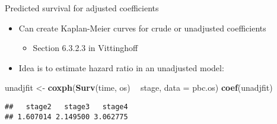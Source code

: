 \documentclass[
  ignorenonframetext,
]{beamer}
\newenvironment{Shaded}{\begin{snugshade}}{\end{snugshade}}
\newcommand{\DataTypeTok}[1]{\textcolor[rgb]{0.13,0.29,0.53}{#1}}
\newcommand{\KeywordTok}[1]{\textcolor[rgb]{0.13,0.29,0.53}{\textbf{#1}}}
\newcommand{\NormalTok}[1]{#1}
\newcommand{\OperatorTok}[1]{\textcolor[rgb]{0.81,0.36,0.00}{\textbf{#1}}}
\newcommand{\StringTok}[1]{\textcolor[rgb]{0.31,0.60,0.02}{#1}}
\providecommand{\tightlist}{%
  \setlength{\itemsep}{0pt}\setlength{\parskip}{0pt}}
\begin{document}
\begin{frame}[fragile]{Predicted survival for adjusted coefficients}
\protect\hypertarget{predicted-survival-for-adjusted-coefficients}{}

\begin{itemize}
\tightlist
\item
  Can create Kaplan-Meier curves for crude or unadjusted coefficients

  \begin{itemize}
  \tightlist
  \item
    Section 6.3.2.3 in Vittinghoff
  \end{itemize}
\item
  Idea is to estimate hazard ratio in an unadjusted model:
\end{itemize}

\footnotesize

\begin{Shaded}
\begin{Highlighting}[]
\NormalTok{unadjfit <-}\StringTok{ }\KeywordTok{coxph}\NormalTok{(}\KeywordTok{Surv}\NormalTok{(time, os) }\OperatorTok{~}\StringTok{ }\NormalTok{stage, }\DataTypeTok{data =}\NormalTok{ pbc.os)}
\KeywordTok{coef}\NormalTok{(unadjfit)}
\end{Highlighting}
\end{Shaded}

\begin{verbatim}
##   stage2   stage3   stage4 
## 1.607014 2.149500 3.062775
\end{verbatim}

\end{frame}
\end{document}
